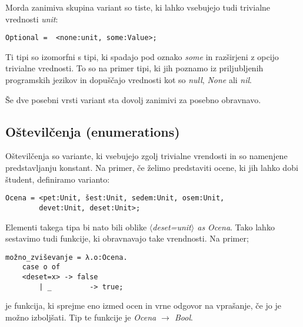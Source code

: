 \documentclass[12pt,a4paper,openany]{book}
\begin{document}
Morda zanimiva skupina variant so tiste, ki lahko vsebujejo tudi trivialne vrednosti \emph{unit}:
\begin{lstlisting}
Optional =  <none:unit, some:Value>;
\end{lstlisting}
Ti tipi so izomorfni s tipi, ki spadajo pod oznako \emph{some} in razširjeni z opcijo trivialne vrednosti. To so na primer tipi, ki jih poznamo iz priljubljenih programskih jezikov in dopuščajo 
vrednosti kot so \emph{null}, \emph{None} ali \emph{nil}.

Še dve posebni vrsti variant sta dovolj zanimivi za posebno obravnavo.

\subsection{Oštevilčenja (enumerations)}
Oštevilčenja so variante, ki vsebujejo zgolj trivialne vrendosti in so namenjene predstavljanju konstant. Na primer, če želimo predstaviti ocene, ki jih lahko dobi študent, definiramo varianto:
\begin{lstlisting}
Ocena = <pet:Unit, šest:Unit, sedem:Unit, osem:Unit, 
        devet:Unit, deset:Unit>;
\end{lstlisting}
Elementi takega tipa bi nato bili oblike \emph{$\langle$deset=unit$\rangle$ as Ocena}. Tako lahko sestavimo tudi funkcije, ki obravnavajo take vrendnosti. Na primer;
\begin{lstlisting}
možno_zviševanje = λ.o:Ocena.
    case o of 
    <deset=x> -> false
        | _         -> true;
\end{lstlisting}
je funkcija, ki sprejme eno izmed ocen in vrne odgovor na vprašanje, če jo je možno izboljšati. Tip te funkcije je \emph{Ocena $\rightarrow$ Bool}.
\end{document}
